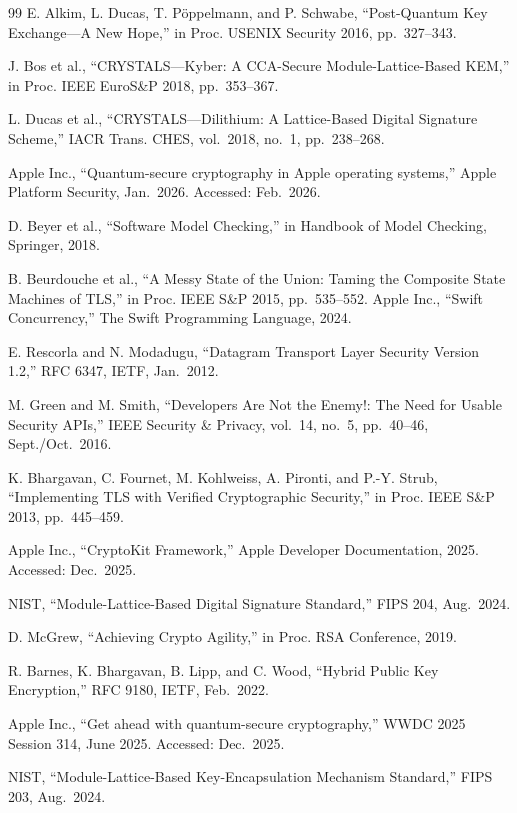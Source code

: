 \documentclass[10pt,journal,compsoc]{IEEEtran}
\begin{document}
\begin{thebibliography}{99}
 E. Alkim, L. Ducas, T. P\"{o}ppelmann, and P. Schwabe, ``Post-Quantum Key Exchange---A New Hope,'' in Proc. USENIX Security 2016, pp.~327--343.

 J. Bos et al., ``CRYSTALS---Kyber: A CCA-Secure Module-Lattice-Based KEM,'' in Proc. IEEE EuroS\&P 2018, pp.~353--367.

 L. Ducas et al., ``CRYSTALS---Dilithium: A Lattice-Based Digital Signature Scheme,'' IACR Trans. CHES, vol.~2018, no.~1, pp.~238--268.

 Apple Inc., ``Quantum-secure cryptography in Apple operating systems,'' Apple Platform Security, Jan.~2026. Accessed: Feb.~2026.

 D. Beyer et al., ``Software Model Checking,'' in Handbook of Model Checking, Springer, 2018.

 B. Beurdouche et al., ``A Messy State of the Union: Taming the Composite State Machines of TLS,'' in Proc. IEEE S\&P 2015, pp.~535--552.
 Apple Inc., ``Swift Concurrency,'' The Swift Programming Language, 2024.

 E. Rescorla and N. Modadugu, ``Datagram Transport Layer Security Version 1.2,'' RFC 6347, IETF, Jan.~2012.

 M. Green and M. Smith, ``Developers Are Not the Enemy!: The Need for Usable Security APIs,'' IEEE Security \& Privacy, vol.~14, no.~5, pp.~40--46, Sept./Oct.~2016.

 K. Bhargavan, C. Fournet, M. Kohlweiss, A. Pironti, and P.-Y. Strub, ``Implementing TLS with Verified Cryptographic Security,'' in Proc. IEEE S\&P 2013, pp.~445--459.

 Apple Inc., ``CryptoKit Framework,'' Apple Developer Documentation, 2025. Accessed: Dec.~2025.

 NIST, ``Module-Lattice-Based Digital Signature Standard,'' FIPS 204, Aug.~2024.

 D. McGrew, ``Achieving Crypto Agility,'' in Proc. RSA Conference, 2019.

 R. Barnes, K. Bhargavan, B. Lipp, and C. Wood, ``Hybrid Public Key Encryption,'' RFC 9180, IETF, Feb.~2022.

 Apple Inc., ``Get ahead with quantum-secure cryptography,'' WWDC 2025 Session 314, June 2025. Accessed: Dec.~2025.

 NIST, ``Module-Lattice-Based Key-Encapsulation Mechanism Standard,'' FIPS 203, Aug.~2024.


\end{thebibliography}
\end{document}
